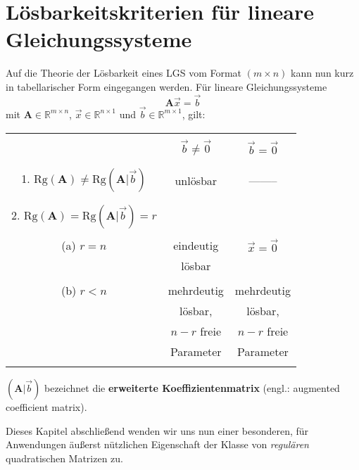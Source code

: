 \section[L\"{o}sbarkeitskriterien]%
{L\"{o}sbarkeitskriterien f\"{u}r lineare Gleichungssysteme}
Auf die Theorie der L\"osbarkeit eines LGS vom Format
$(m \times n)$ kann nun kurz in tabellarischer Form eingegangen
werden. F\"ur lineare Gleichungssysteme
%
$$
\mathbf{A}\vec{x} = \vec{b}
$$
%
mit $\mathbf{A} \in \mathbb{R}^{m \times n}$, $\vec{x} \in
\mathbb{R}^{n \times 1}$ und $\vec{b} \in \mathbb{R}^{m \times 1}$,
gilt:

%
\begin{center}
	\begin{tabular}[h]{c|c|c}
		\hline\hline
		 & & \\
		 & $\vec{b} \neq \vec{0}$ &
		 $\vec{b} = \vec{0}$ \\
		 & & \\
		\hline
		 & & \\
		1. $\text{Rg}(\mathbf{A}) \neq \text{Rg}(\mathbf{A}|\vec{b})$ &
		unl\"osbar & -------- \\
		 & & \\
		\hline
		 & & \\
		2. $\text{Rg}(\mathbf{A}) = \text{Rg}(\mathbf{A}|\vec{b}) = r$ &
		& \\
		 & & \\
		(a) \quad $r = n$ & eindeutig & $\vec{x} = \vec{0}$ \\
		 & l\"osbar & \\
		 & & \\
		(b) \quad $r < n$ & mehrdeutig & mehrdeutig \\
		 & l\"osbar, & l\"osbar, \\
		 & $n-r$ freie &  $n-r$ freie \\
		 & Parameter & Parameter \\
		 & & \\
		\hline\hline
	 \end{tabular}
\end{center}
%

\noindent
$(\mathbf{A}|\vec{b})$ bezeichnet die {\bf erweiterte
Koeffizientenmatrix} (engl.: augmented coefficient matrix).

\medskip
\noindent
Dieses Kapitel abschlie\ss end wenden wir uns nun einer besonderen,
f\"ur Anwendungen \"au\ss erst n\"utzlichen Eigenschaft der
Klasse von {\em regul\"aren\/} quadratischen Matrizen zu.

